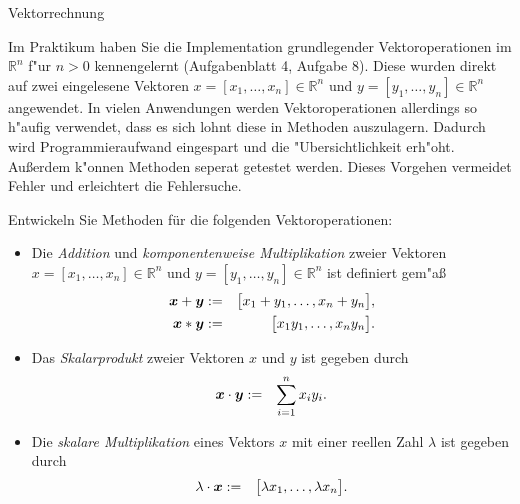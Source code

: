 \begin{exercise}{Vektorrechnung}

\begin{body}
Im Praktikum haben Sie die Implementation grundlegender Vektoroperationen im $\mathbb R^n$ f"ur $n>0$ kennengelernt (Aufgabenblatt 4, Aufgabe 8).
Diese wurden direkt auf zwei eingelesene Vektoren $x=[x_1,\ldots,x_n]\in\mathbb R^n$ und $y=[y_1,\ldots,y_n]\in\mathbb R^n$ angewendet.
In vielen Anwendungen werden Vektoroperationen allerdings so h"aufig verwendet, dass es sich lohnt diese in Methoden auszulagern. Dadurch
wird Programmieraufwand eingespart und die "Ubersichtlichkeit erh"oht. Außerdem k"onnen Methoden seperat getestet werden. Dieses Vorgehen
vermeidet Fehler und erleichtert die Fehlersuche.
\bigskip

\noindent
Entwickeln Sie Methoden für die folgenden Vektoroperationen:
\begin{itemize}
 \item Die {\em Addition} und {\em komponentenweise Multiplikation} zweier Vektoren
    \mbox{\boldmath $x=[x_1,\ldots,x_n]\in \mathbb{R}^n$} und
    \mbox{\boldmath $y=[y_1,\ldots,y_n]\in \mathbb{R}^n$} ist definiert gem"a{\ss}
    \begin{eqnarray*}        
      \mbox{\boldmath $x$} + \mbox{\boldmath $y$} &:=&  \bigl[ x_1 + y_1, \ldots, x_n + y_n \bigr], \\
      \mbox{\boldmath $x$}  * \mbox{\boldmath $y$} &:=&  \bigl[ x_1 y_1,\ldots, x_n y_n \bigr].
    \end{eqnarray*}
\item Das {\em Skalarprodukt} zweier Vektoren
\mbox{\boldmath $x$} und  \mbox{\boldmath $y$} ist gegeben 
    durch
    \begin{eqnarray*}          
      \mbox{\boldmath $x$}   \cdot         \mbox{\boldmath $y$} &:=&	 \sum_{i=1}^n x_i y_i.
    \end{eqnarray*}
\item Die {\em skalare Multiplikation} eines Vektors \mbox{\boldmath $x$} 
    mit einer reellen Zahl $\lambda$ ist gegeben durch 
    \begin{eqnarray*}        
      \lambda \cdot \mbox{\boldmath $x$} &:=&  \bigl[ \lambda  x_1, \ldots, \lambda  x_n       \bigr].
    \end{eqnarray*}
\end{itemize}
\newpage


\end{body}
\end{exercise}
